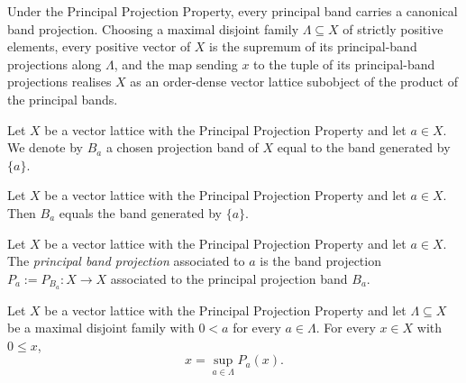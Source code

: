 Under the Principal Projection Property, every principal band carries a
canonical band projection. Choosing a maximal disjoint family $\Lambda
\subseteq X$ of strictly positive elements, every positive vector of
$X$ is the supremum of its principal-band projections along $\Lambda$,
and the map sending $x$ to the tuple of its principal-band projections
realises $X$ as an order-dense vector lattice subobject of the product
of the principal bands.

\begin{definition}
\label{def:band-principalProjectionBand}
\leanok
{}
Let $X$ be a vector lattice with the Principal Projection Property
and let $a \in X$. We denote by $B_a$ a chosen projection band of $X$
equal to the band generated by $\{a\}$.
\end{definition}

\begin{lemma}
\label{lem:band-principalProjectionBand-coe}
\leanok
{}
Let $X$ be a vector lattice with the Principal Projection Property
and let $a \in X$. Then $B_a$ equals the band generated by $\{a\}$.
\end{lemma}

\begin{definition}
\label{def:band-principalBandProjection}
\leanok
{}
Let $X$ be a vector lattice with the Principal Projection Property
and let $a \in X$. The \emph{principal band projection} associated to
$a$ is the band projection $P_a := P_{B_a} \colon X \to X$ associated
to the principal projection band $B_a$.
\end{definition}

\begin{theorem}
\label{thm:isLUB-principalBandProjection-of-isMaximalDisjoint}
\leanok
{}
Let $X$ be a vector lattice with the Principal Projection Property
and let $\Lambda \subseteq X$ be a maximal disjoint family with
$0 < a$ for every $a \in \Lambda$. For every $x \in X$ with
$0 \le x$,
\[
  x = \sup_{a \in \Lambda} P_a(x).
\]
\end{theorem}

